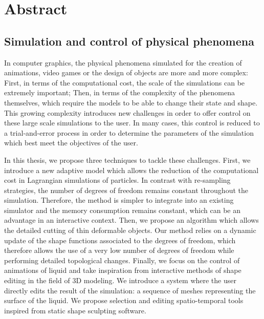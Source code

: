 \chapter*[Abstract]{Abstract}

\section*{\Large{Simulation and control of physical phenomena}}

In computer graphics, the physical phenomena simulated for the creation of animations, video games or the design of objects are more and more complex:
First, in terms of the computational cost, the scale of the simulations can be extremely important;
Then, in terms of the complexity of the phenomena themselves, which require the models to be able to change their state and shape.
This growing complexity introduces new challenges in order to offer control on these large scale simulations to the user.
In many cases, this control is reduced to a trial-and-error process in order to determine the parameters of the simulation which best meet the objectives of the user.

In this thesis, we propose three techniques to tackle these challenges.
First, we introduce a new adaptive model which allows the reduction of the computational cost in Lagrangian simulations of particles.
In contrast with re-sampling strategies, the number of degrees of freedom remains constant throughout the simulation.
Therefore, the method is simpler to integrate into an existing simulator and the memory consumption remains constant, which can be an advantage in an interactive context.
Then, we propose an algorithm which allows the detailed cutting of thin deformable objects.
Our method relies on a dynamic update of the shape functions associated to the degrees of freedom, which therefore allows the use of a very low number of degrees of freedom while performing detailed topological changes.
Finally, we focus on the control of animations of liquid and take inspiration from interactive methods of shape editing in the field of 3D modeling.
We introduce a system where the user directly edits the result of the simulation: a sequence of meshes representing the surface of the liquid.
We propose selection and editing spatio-temporal tools inspired from static shape sculpting software.

